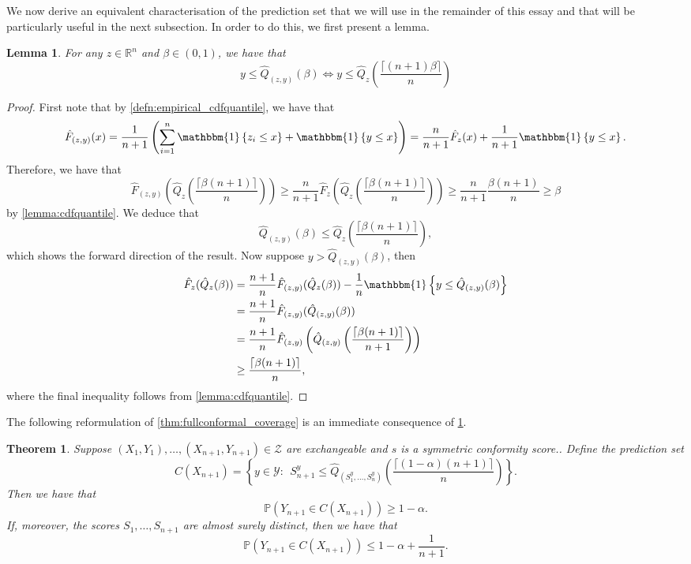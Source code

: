 \documentclass[11pt, titlepage]{article} %
\newcommand{\Prob}[1]{\mathbb{P}\left( #1 \right)}
\newcommand{\Ind}[1]{\mathbbm{1}\left\{ #1 \right\}}
\numberwithin{equation}{section}
\newtheorem{theorem}{Theorem}
\newtheorem{lemma}{Lemma}
\theoremstyle{definition}
\numberwithin{theorem}{section}
\numberwithin{lemma}{section}
\numberwithin{corollary}{section}
\numberwithin{proposition}{section}
\numberwithin{definition}{section}
\numberwithin{remark}{section}
\begin{document}
\noindent
We now derive an equivalent characterisation of the prediction set that we will use in the remainder of this essay and that will be particularly useful in the next subsection. In order to do this, we first present a lemma.

\begin{lemma}
    For any \(z \in \mathbb{R}^n\) and \(\beta \in (0,1)\), we have that \[y \leq \hat{Q}_{(z,y)} (\beta) \iff y \leq \hat{Q}_z\left( \frac{\lceil (n+1)\beta \rceil }{n} \right)\]
\label{lemma:quantile_lemma}
\end{lemma}

\begin{proof}
    First note that by \cref{defn:empirical_cdfquantile}, we have that \[\hat{F}_{(z,y)} (x) = \frac{1}{n+1} \left( \sum_{i=1}^n \Ind{z_i \leq x} + \Ind{y \leq x} \right) = \frac{n}{n+1} \hat{F}_z(x) + \frac{1}{n+1}\Ind{y \leq x}.\] Therefore, we have that \[\hat{F}_{(z,y)}\left(  \hat{Q}_z \left( \frac{\lceil \beta (n+1) \rceil }{n} \right) \right) \geq \frac{n}{n+1} \hat{F}_z \left( \hat{Q}_z \left( \frac{\lceil \beta (n+1) \rceil }{n} \right) \right) \geq \frac{n}{n+1} \frac{\beta(n+1)}{n} \geq \beta \] by \cref{lemma:cdfquantile}. We deduce that \[\hat{Q}_{(z,y)}(\beta) \leq \hat{Q}_z \left( \frac{\lceil \beta (n+1) \rceil }{n} \right), \] which shows the forward direction of the result. Now suppose \(y > \hat{Q}_{(z,y)}(\beta) \), then \begin{align*}
        \hat{F}_z(\hat{Q}_z(\beta)) &= \frac{n+1}{n} \hat{F}_{(z,y)}(\hat{Q}_z(\beta)) - \frac{1}{n} \Ind{y \leq \hat{Q}_{(z,y)}(\beta)} \\
        &= \frac{n+1}{n} \hat{F}_{(z,y)} (\hat{Q}_{(z,y)} (\beta) ) \\
        &= \frac{n+1}{n} \hat{F}_{(z,y)} \left(  \hat{Q}_{(z,y)} \left( \frac{\lceil \beta (n+1) \rceil }{n+1} \right) \right) \\
        &\geq \frac{\lceil \beta (n+1) \rceil }{n}, 
    \end{align*} where the final inequality follows from \cref{lemma:cdfquantile}.
\end{proof}

\noindent The following reformulation of \cref{thm:fullconformal_coverage} is an immediate consequence of \cref{lemma:quantile_lemma}.

\begin{theorem}
    Suppose \((X_1, Y_1), \ldots, (X_{n+1}, Y_{n+1}) \in \mathcal{Z}\) are exchangeable and \(s\) is a symmetric conformity score.. Define the prediction set \begin{equation}
        C(X_{n+1}) = \left\{ y \in \mathcal{Y}: \ \ S_{n+1}^y \leq \hat{Q}_{(S_1^y, \ldots, S_n^y)} \left(\frac{\lceil (1-\alpha)(n+1) \rceil}{n}\right) \right\}.
    \label{eqn:fullconformal_prediction_set_v2}
    \end{equation} Then we have that \[\Prob{Y_{n+1} \in C(X_{n+1})} \geq 1-\alpha.\] If, moreover, the scores \(S_1, \ldots, S_{n+1}\) are almost surely distinct, then we have that \[\Prob{Y_{n+1} \in C(X_{n+1})} \leq 1-\alpha + \frac{1}{n+1}.\]

\label{thm:fullconformal_coverage_v2}  
\end{theorem}
\end{document}
